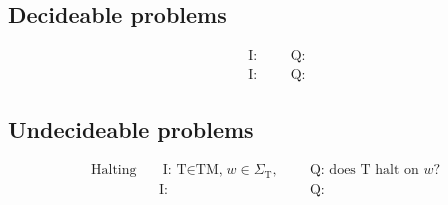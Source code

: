 \documentclass{article}
\theoremstyle{remark}
\numberwithin{equation}{section}
\begin{document}
\subsection{Decideable problems}
\begin{align}
	&\text{} &&\text{I:} &&&\text{Q:}\\
	&\text{} &&\text{I:} &&&\text{Q:}
\end{align}
\subsection{Undecideable problems}
\begin{align}
	&\text{Halting} &&\text{I: T$\in$TM,}w\in\Sigma_\text{T} \text{,}&&&\text{Q: does T halt on }w?\\
	&\text{} &&\text{I:} &&&\text{Q:}
\end{align}
\end{document}
